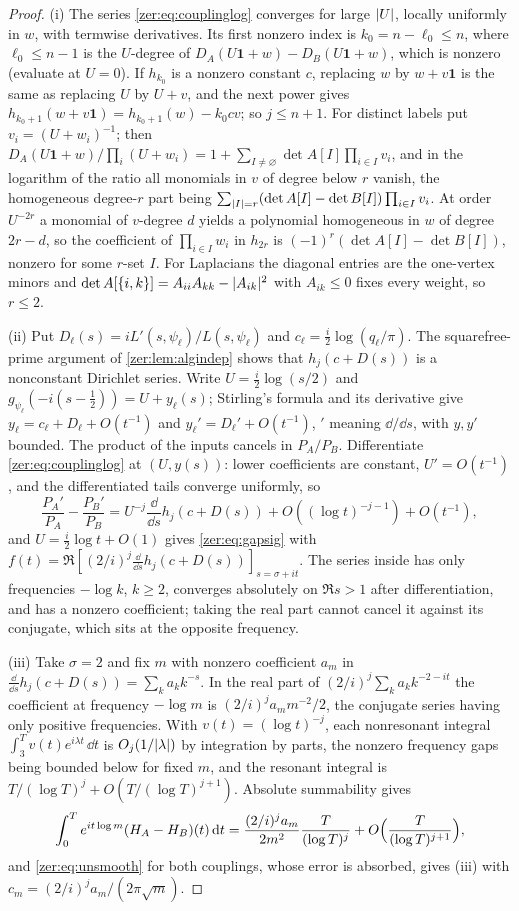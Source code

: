 \begin{proof}
(i) The series \eqref{zer:eq:couplinglog} converges for large $\lvert U\rvert$, locally uniformly in $w$, with
termwise derivatives. Its first nonzero index is $k_0=n-\ell_0\le n$, where $\ell_0\le n-1$ is the
$U$-degree of $D_A(U\mathbf 1+w)-D_B(U\mathbf 1+w)$, which is nonzero (evaluate at $U=0$). If $h_{k_0}$ is a
nonzero constant $c$, replacing $w$ by $w+v\mathbf 1$ is the same as replacing $U$ by $U+v$, and the next
power gives $h_{k_0+1}(w+v\mathbf 1)=h_{k_0+1}(w)-k_0cv$; so $j\le n+1$. For distinct labels put
$v_i=(U+w_i)^{-1}$; then $D_A(U\mathbf 1+w)/\prod_i(U+w_i)=1+\sum_{I\ne\varnothing}\det A[I]\prod_{i\in I}v_i$,
and in the logarithm of the ratio all monomials in $v$ of degree below $r$ vanish, the homogeneous degree-$r$
part being $\sum_{\lvert I\rvert=r}(\det A[I]-\det B[I])\prod_{i\in I}v_i$. At order $U^{-2r}$ a monomial of
$v$-degree $d$ yields a polynomial homogeneous in $w$ of degree $2r-d$, so the coefficient of
$\prod_{i\in I}w_i$ in $h_{2r}$ is $(-1)^r(\det A[I]-\det B[I])$, nonzero for some $r$-set $I$. For
Laplacians the diagonal entries are the one-vertex minors and
$\det A[\{i,k\}]=A_{ii}A_{kk}-\lvert A_{ik}\rvert^2$ with $A_{ik}\le0$ fixes every weight, so $r\le2$.

(ii) Put $D_\ell(s)=iL'(s,\psi_\ell)/L(s,\psi_\ell)$ and $c_\ell=\tfrac i2\log(q_\ell/\pi)$. The squarefree-prime
argument of \cref{zer:lem:algindep} shows that $h_j(c+D(s))$ is a nonconstant Dirichlet series. Write
$U=\tfrac i2\log(s/2)$ and $g_{\psi_\ell}(-i(s-\tfrac12))=U+y_\ell(s)$; Stirling's formula and its derivative
give $y_\ell=c_\ell+D_\ell+O(t^{-1})$ and $y_\ell'=D_\ell'+O(t^{-1})$, $'$ meaning $\dd/\dd s$, with $y,y'$
bounded. The product of the inputs cancels in $P_A/P_B$. Differentiate \eqref{zer:eq:couplinglog} at
$(U,y(s))$: lower coefficients are constant, $U'=O(t^{-1})$, and the differentiated tails converge
uniformly, so
\[
 \frac{P_A'}{P_A}-\frac{P_B'}{P_B}=U^{-j}\frac{\dd}{\dd s}h_j(c+D(s))+O((\log t)^{-j-1})+O(t^{-1}),
\]
and $U=\tfrac i2\log t+O(1)$ gives \eqref{zer:eq:gapsig} with
$f(t)=\Re[(2/i)^j\tfrac{\dd}{\dd s}h_j(c+D(s))]_{s=\sigma+it}$. The series inside has only frequencies
$-\log k$, $k\ge2$, converges absolutely on $\Re s>1$ after differentiation, and has a nonzero coefficient;
taking the real part cannot cancel it against its conjugate, which sits at the opposite frequency.

(iii) Take $\sigma=2$ and fix $m$ with nonzero coefficient $a_m$ in $\tfrac{\dd}{\dd s}h_j(c+D(s))=\sum_ka_kk^{-s}$.
In the real part of $(2/i)^j\sum_ka_kk^{-2-it}$ the coefficient at frequency $-\log m$ is
$(2/i)^ja_mm^{-2}/2$, the conjugate series having only positive frequencies. With $v(t)=(\log t)^{-j}$, each
nonresonant integral $\int_3^Tv(t)e^{i\lambda t}\,\dd t$ is $O_j(1/\lvert\lambda\rvert)$ by integration by parts, the
nonzero frequency gaps being bounded below for fixed $m$, and the resonant integral is
$T/(\log T)^j+O(T/(\log T)^{j+1})$. Absolute summability gives
\[
 \int_0^Te^{it\log m}(H_A-H_B)(t)\,\mathrm{d} t=\frac{(2/i)^ja_m}{2m^2}\frac T{(\log T)^j}+O\Bigl(\frac T{(\log T)^{j+1}}\Bigr),
\]
and \eqref{zer:eq:unsmooth} for both couplings, whose error is absorbed, gives (iii) with
$c_m=(2/i)^ja_m/(2\pi\sqrt m)$.
\end{proof}

